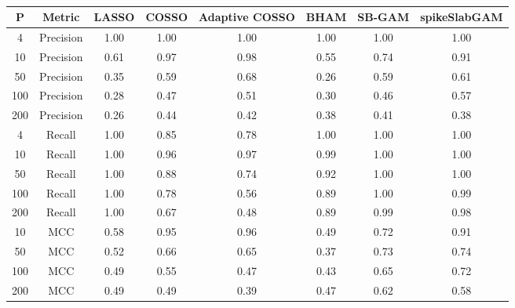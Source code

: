 \begin{table}[ht]
\centering
\begin{tabular}{cccccccc}
  \hline
P & Metric & LASSO & COSSO & Adaptive COSSO & BHAM & SB-GAM & spikeSlabGAM \\ 
  \hline
  4 & Precision & 1.00 & 1.00 & 1.00 & 1.00 & 1.00 & 1.00 \\ 
   10 & Precision & 0.61 & 0.97 & 0.98 & 0.55 & 0.74 & 0.91 \\ 
   50 & Precision & 0.35 & 0.59 & 0.68 & 0.26 & 0.59 & 0.61 \\ 
  100 & Precision & 0.28 & 0.47 & 0.51 & 0.30 & 0.46 & 0.57 \\ 
  200 & Precision & 0.26 & 0.44 & 0.42 & 0.38 & 0.41 & 0.38 \\ 
    4 & Recall & 1.00 & 0.85 & 0.78 & 1.00 & 1.00 & 1.00 \\ 
   10 & Recall & 1.00 & 0.96 & 0.97 & 0.99 & 1.00 & 1.00 \\ 
   50 & Recall & 1.00 & 0.88 & 0.74 & 0.92 & 1.00 & 1.00 \\ 
  100 & Recall & 1.00 & 0.78 & 0.56 & 0.89 & 1.00 & 0.99 \\ 
  200 & Recall & 1.00 & 0.67 & 0.48 & 0.89 & 0.99 & 0.98 \\ 
   10 & MCC & 0.58 & 0.95 & 0.96 & 0.49 & 0.72 & 0.91 \\ 
   50 & MCC & 0.52 & 0.66 & 0.65 & 0.37 & 0.73 & 0.74 \\ 
  100 & MCC & 0.49 & 0.55 & 0.47 & 0.43 & 0.65 & 0.72 \\ 
  200 & MCC & 0.49 & 0.49 & 0.39 & 0.47 & 0.62 & 0.58 \\ 
   \hline
\end{tabular}
\caption{} 
\label{tab:sim_lnr_binom_var_select}
\end{table}
